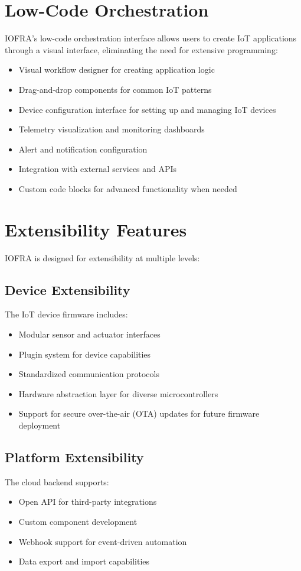 \documentclass[conference]{IEEEtran}
\begin{document}
\section{Low-Code Orchestration}
IOFRA's low-code orchestration interface allows users to create IoT applications through a visual interface, eliminating the need for extensive programming:

\begin{itemize}
    \item Visual workflow designer for creating application logic
    \item Drag-and-drop components for common IoT patterns
    \item Device configuration interface for setting up and managing IoT devices
    \item Telemetry visualization and monitoring dashboards
    \item Alert and notification configuration
    \item Integration with external services and APIs
    \item Custom code blocks for advanced functionality when needed
\end{itemize}

\section{Extensibility Features}
IOFRA is designed for extensibility at multiple levels:

\subsection{Device Extensibility}
The IoT device firmware includes:
\begin{itemize}
    \item Modular sensor and actuator interfaces
    \item Plugin system for device capabilities
    \item Standardized communication protocols
    \item Hardware abstraction layer for diverse microcontrollers
    \item Support for secure over-the-air (OTA) updates for future firmware deployment
\end{itemize}

\subsection{Platform Extensibility}
The cloud backend supports:
\begin{itemize}
    \item Open API for third-party integrations
    \item Custom component development
    \item Webhook support for event-driven automation
    \item Data export and import capabilities
\end{itemize}
\end{document}
